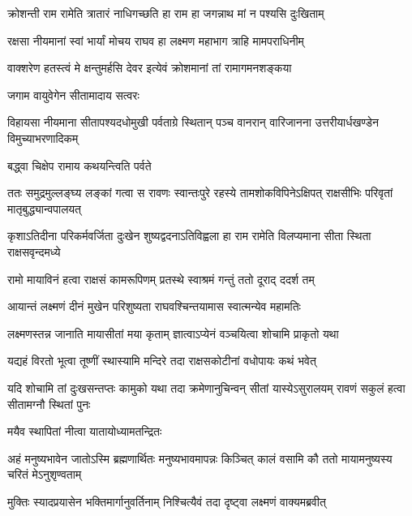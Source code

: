 \twolineshloka
{क्रोशन्ती राम रामेति त्रातारं नाधिगच्छति}
{हा राम हा जगन्नाथ मां न पश्यसि दुःखिताम्} %

\twolineshloka
{रक्षसा नीयमानां स्वां भार्यां मोचय राघव}
{हा लक्ष्मण महाभाग त्राहि मामपराधिनीम्} %

\twolineshloka
{वाक्शरेण हतस्त्वं मे क्षन्तुमर्हसि देवर}
{इत्येवं क्रोशमानां तां रामागमनशङ्कया} %

\onelineshloka
{जगाम वायुवेगेन सीतामादाय सत्वरः} %


\threelineshloka
{विहायसा नीयमाना सीतापश्यदधोमुखी}
{पर्वताग्रे स्थितान् पञ्च वानरान् वारिजानना}
{उत्तरीयार्धखण्डेन विमुच्याभरणादिकम्} %

\onelineshloka
{बद्\mbox{}ध्वा चिक्षेप रामाय कथयन्त्विति पर्वते} %


\threelineshloka
{ततः समुद्रमुल्लङ्घ्य लङ्कां गत्वा स रावणः}
{स्वान्तःपुरे रहस्ये तामशोकविपिनेऽक्षिपत्}
{राक्षसीभिः परिवृतां मातृबुद्ध्यान्वपालयत्} %

\fourlineindentedshloka
{कृशाऽतिदीना परिकर्मवर्जिता}
{दुःखेन शुष्यद्वदनाऽतिविह्वला}
{हा राम रामेति विलप्यमाना}
{सीता स्थिता राक्षसवृन्दमध्ये} %






\twolineshloka
{रामो मायाविनं हत्वा राक्षसं कामरूपिणम्}
{प्रतस्थे स्वाश्रमं गन्तुं ततो दूराद् ददर्श तम्} %

\twolineshloka
{आयान्तं लक्ष्मणं दीनं मुखेन परिशुष्यता}
{राघवश्चिन्तयामास स्वात्मन्येव महामतिः} %

\twolineshloka
{लक्ष्मणस्तन्न जानाति मायासीतां मया कृताम्}
{ज्ञात्वाऽप्येनं वञ्चयित्वा शोचामि प्राकृतो यथा} %

\twolineshloka
{यद्यहं विरतो भूत्वा तूष्णीं स्थास्यामि मन्दिरे}
{तदा राक्षसकोटीनां वधोपायः कथं भवेत्} %

\threelineshloka
{यदि शोचामि तां दुःखसन्तप्तः कामुको यथा}
{तदा क्रमेणानुचिन्वन् सीतां यास्येऽसुरालयम्}
{रावणं सकुलं हत्वा सीतामग्नौ स्थितां पुनः} %

\onelineshloka
{मयैव स्थापितां नीत्वा यातायोध्यामतन्द्रितः} %


\threelineshloka
{अहं मनुष्यभावेन जातोऽस्मि ब्रह्मणार्थितः}
{मनुष्यभावमापन्नः किञ्चित् कालं वसामि कौ}
{ततो मायामनुष्यस्य चरितं मेऽनुशृण्वताम्} %

\twolineshloka
{मुक्तिः स्यादप्रयासेन भक्तिमार्गानुवर्तिनाम्}
{निश्चित्यैवं तदा दृष्ट्वा लक्ष्मणं वाक्यमब्रवीत्} %

